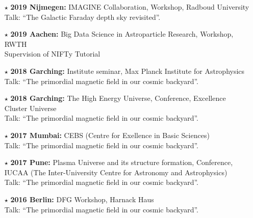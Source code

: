 \documentclass[11pt,a4paper,sans, table, dvipsnames]{moderncv}        %
\begin{document}
\begin{itemize}
\begin{itemize}
    \item[\textcolor{Black}{$\star$}]{\textbf{2019 Nijmegen:} IMAGINE Collaboration, Workshop, Radboud University\\ Talk: ``The Galactic Faraday depth sky revisited''.}

    \item[\textcolor{Black}{$\star$}]{\textbf{2019 Aachen:} Big Data Science in Astroparticle Research, Workshop, RWTH \\ Supervision of NIFTy Tutorial}

    \item[\textcolor{Black}{$\star$}]{\textbf{2018 Garching:} Institute seminar, Max Planck Institute for Astrophysics\\ Talk: ``The primordial magnetic field in our cosmic backyard''.}

    \item[\textcolor{Black}{$\star$}]{\textbf{2018 Garching:} The High Energy Universe, Conference, Excellence Cluster Universe \\ Talk: ``The primordial magnetic field in our cosmic backyard''.}

    \item[\textcolor{Black}{$\star$}]{\textbf{2017 Mumbai:} CEBS (Centre for Exellence in Basic
    Sciences) \\ Talk: ``The primordial magnetic field in our cosmic backyard''.}

    \item[\textcolor{Black}{$\star$}]{\textbf{2017 Pune:} Plasma Universe and its structure formation, Conference, IUCAA (The Inter-University Centre for Astronomy and Astrophysics)\\ Talk: ``The primordial magnetic field in our cosmic backyard''.}

    \item[\textcolor{Black}{$\star$}]{\textbf{2016 Berlin:} DFG Workshop, Harnack Haus\\ Talk: ``The primordial magnetic field in our cosmic backyard''.}
  \end{itemize}

\end{itemize}

\vspace{\baselineskip}
\end{document}
